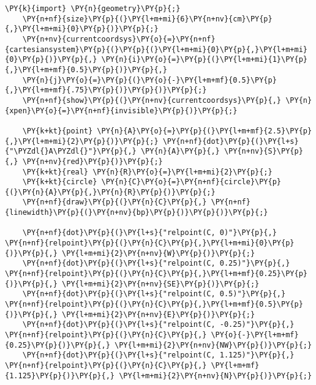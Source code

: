 \begin{Verbatim}[commandchars=\\\{\}]
    \PY{k}{import} \PY{n}{geometry}\PY{p}{;}
    \PY{n+nf}{size}\PY{p}{(}\PY{l+m+mi}{6}\PY{n+nv}{cm}\PY{p}{,}\PY{l+m+mi}{0}\PY{p}{)}\PY{p}{;}
    \PY{n+nv}{currentcoordsys}\PY{o}{=}\PY{n+nf}{cartesiansystem}\PY{p}{(}\PY{p}{(}\PY{l+m+mi}{0}\PY{p}{,}\PY{l+m+mi}{0}\PY{p}{)}\PY{p}{,} \PY{n}{i}\PY{o}{=}\PY{p}{(}\PY{l+m+mi}{1}\PY{p}{,}\PY{l+m+mf}{0.5}\PY{p}{)}\PY{p}{,}
    \PY{n}{j}\PY{o}{=}\PY{p}{(}\PY{o}{-}\PY{l+m+mf}{0.5}\PY{p}{,}\PY{l+m+mf}{.75}\PY{p}{)}\PY{p}{)}\PY{p}{;}
    \PY{n+nf}{show}\PY{p}{(}\PY{n+nv}{currentcoordsys}\PY{p}{,} \PY{n}{xpen}\PY{o}{=}\PY{n+nf}{invisible}\PY{p}{)}\PY{p}{;}

    \PY{k+kt}{point} \PY{n}{A}\PY{o}{=}\PY{p}{(}\PY{l+m+mf}{2.5}\PY{p}{,}\PY{l+m+mi}{2}\PY{p}{)}\PY{p}{;} \PY{n+nf}{dot}\PY{p}{(}\PY{l+s}{"\PYZdl{}A\PYZdl{}"}\PY{p}{,} \PY{n}{A}\PY{p}{,} \PY{n+nv}{S}\PY{p}{,} \PY{n+nv}{red}\PY{p}{)}\PY{p}{;}
    \PY{k+kt}{real} \PY{n}{R}\PY{o}{=}\PY{l+m+mi}{2}\PY{p}{;}
    \PY{k+kt}{circle} \PY{n}{C}\PY{o}{=}\PY{n+nf}{circle}\PY{p}{(}\PY{n}{A}\PY{p}{,}\PY{n}{R}\PY{p}{)}\PY{p}{;}
    \PY{n+nf}{draw}\PY{p}{(}\PY{n}{C}\PY{p}{,} \PY{n+nf}{linewidth}\PY{p}{(}\PY{n+nv}{bp}\PY{p}{)}\PY{p}{)}\PY{p}{;}

    \PY{n+nf}{dot}\PY{p}{(}\PY{l+s}{"relpoint(C, 0)"}\PY{p}{,} \PY{n+nf}{relpoint}\PY{p}{(}\PY{n}{C}\PY{p}{,}\PY{l+m+mi}{0}\PY{p}{)}\PY{p}{,} \PY{l+m+mi}{2}\PY{n+nv}{W}\PY{p}{)}\PY{p}{;}
    \PY{n+nf}{dot}\PY{p}{(}\PY{l+s}{"relpoint(C, 0.25)"}\PY{p}{,} \PY{n+nf}{relpoint}\PY{p}{(}\PY{n}{C}\PY{p}{,}\PY{l+m+mf}{0.25}\PY{p}{)}\PY{p}{,} \PY{l+m+mi}{2}\PY{n+nv}{SE}\PY{p}{)}\PY{p}{;}
    \PY{n+nf}{dot}\PY{p}{(}\PY{l+s}{"relpoint(C, 0.5)"}\PY{p}{,} \PY{n+nf}{relpoint}\PY{p}{(}\PY{n}{C}\PY{p}{,}\PY{l+m+mf}{0.5}\PY{p}{)}\PY{p}{,} \PY{l+m+mi}{2}\PY{n+nv}{E}\PY{p}{)}\PY{p}{;}
    \PY{n+nf}{dot}\PY{p}{(}\PY{l+s}{"relpoint(C, -0.25)"}\PY{p}{,} \PY{n+nf}{relpoint}\PY{p}{(}\PY{n}{C}\PY{p}{,} \PY{o}{-}\PY{l+m+mf}{0.25}\PY{p}{)}\PY{p}{,} \PY{l+m+mi}{2}\PY{n+nv}{NW}\PY{p}{)}\PY{p}{;}
    \PY{n+nf}{dot}\PY{p}{(}\PY{l+s}{"relpoint(C, 1.125)"}\PY{p}{,} \PY{n+nf}{relpoint}\PY{p}{(}\PY{n}{C}\PY{p}{,} \PY{l+m+mf}{1.125}\PY{p}{)}\PY{p}{,} \PY{l+m+mi}{2}\PY{n+nv}{N}\PY{p}{)}\PY{p}{;}
\end{Verbatim}
